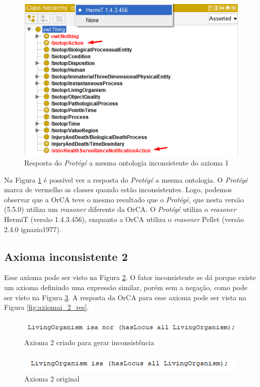 \documentclass{bcc}
\begin{document}
\begin{figure}[H]
\centering
\includegraphics[width=.6\textwidth]{Figuras/axiomai_1_protege.png}
\caption{Resposta do \textit{Protégé} a mesma ontologia inconsistente do axioma 1} 
\label{fig:axiomai_1_protege}
\end{figure}

Na Figura \ref{fig:axiomai_1_protege} é possível ver a resposta do \textit{Protégé} a mesma ontologia. O \textit{Protégé} marca de vermelho as classes quando estão inconsistentes. Logo, podemos observar que a OrCA teve o mesmo resultado que o \textit{Protégé}, que nesta versão (5.5.0) utiliza um \textit{reasoner} diferente da OrCA. O \textit{Protégé} utiliza o \textit{reasoner} HermiT (versão 1.4.3.456), enquanto a OrCA utiliza o \textit{reasoner} Pellet (versão 2.4.0 ignazio1977).


\subsection{Axioma inconsistente 2}
Esse axioma pode ser visto na Figura \ref{fig:axiomai_2}. O fator inconsistente se dá porque existe um axioma definindo uma expressão similar, porém sem a negação, como pode ser visto na Figura \ref{fig:axiomai_2_o}. A resposta da OrCA para esse axioma pode ser vista na Figura \ref{fig:axiomai_2_res}.

\begin{figure}[H]
\centering
\includegraphics[width=.5\textwidth]{Figuras/axiomai_2.png}
\caption{Axioma 2 criado para gerar inconsistência} 
\label{fig:axiomai_2}
\end{figure}

\begin{figure}[H]
\centering
\includegraphics[width=.5\textwidth]{Figuras/axiomai_2_o.png}
\caption{Axioma 2 original} 
\label{fig:axiomai_2_o}
\end{figure}
\end{document}
